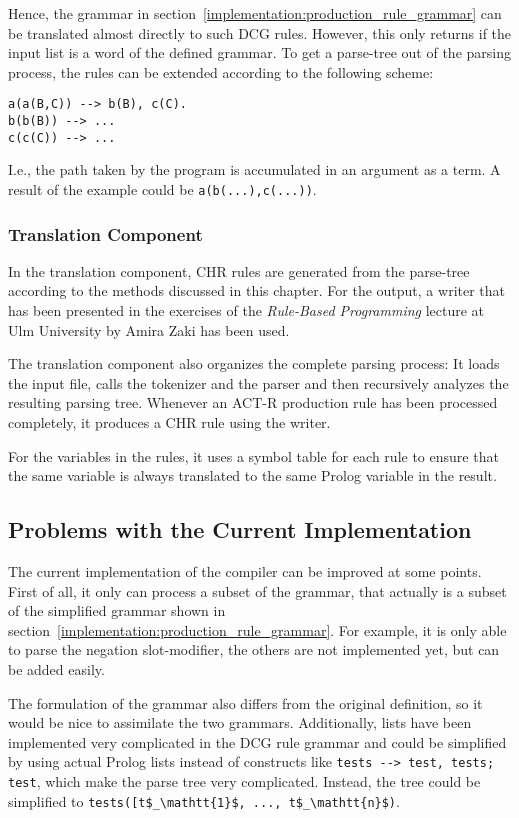 Hence, the grammar in section~\ref{implementation:production_rule_grammar} can be translated almost directly to such DCG rules. However, this only returns if the input list is a word of the defined grammar. To get a parse-tree out of the parsing process, the rules can be extended according to the following scheme:

\begin{lstlisting}
a(a(B,C)) --> b(B), c(C).
b(b(B)) --> ...
c(c(C)) --> ...
\end{lstlisting}

I.e., the path taken by the program is accumulated in an argument as a term. A result of the example could be \lstinline|a(b(...),c(...))|.

\subsubsection{Translation Component}

In the translation component, CHR rules are generated from the parse-tree according to the methods discussed in this chapter. For the output, a writer that has been presented in the exercises of the \emph{Rule-Based Programming} lecture at Ulm University by Amira Zaki \cite{chr_homepage} has been used.

The translation component also organizes the complete parsing process: It loads the input file, calls the tokenizer and the parser and then recursively analyzes the resulting parsing tree. Whenever an ACT-R production rule has been processed completely, it produces a CHR rule using the writer.

For the variables in the rules, it uses a symbol table for each rule to ensure that the same variable is always translated to the same Prolog variable in the result.

\subsection{Problems with the Current Implementation}

The current implementation of the compiler can be improved at some points. First of all, it only can process a subset of the grammar, that actually is a subset of the simplified grammar shown in section~\ref{implementation:production_rule_grammar}. For example, it is only able to parse the negation slot-modifier, the others are not implemented yet, but can be added easily.

The formulation of the grammar also differs from the original definition, so it would be nice to assimilate the two grammars. Additionally, lists have been implemented very complicated in the DCG rule grammar and could be simplified by using actual Prolog lists instead of constructs like \lstinline|tests --> test, tests; test|, which make the parse tree very complicated. Instead, the tree could be simplified to \lstinline[mathescape]|tests([t$_\mathtt{1}$, ..., t$_\mathtt{n}$)|.

